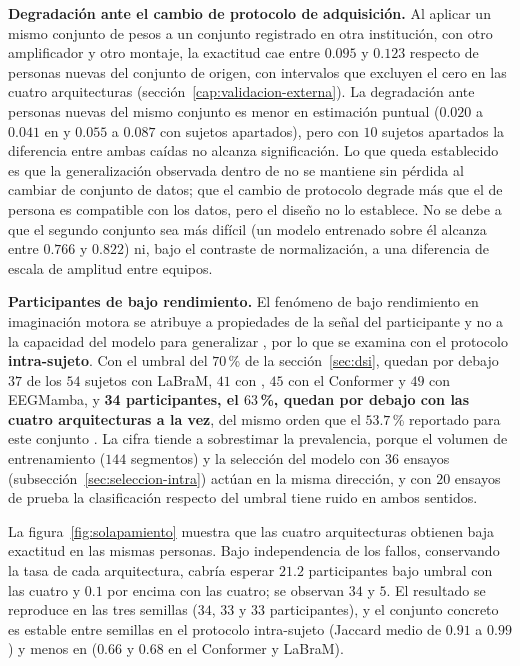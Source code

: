 \textbf{Degradación ante el cambio de protocolo de adquisición.} Al aplicar un mismo conjunto de pesos a un
conjunto registrado en otra institución, con otro amplificador y otro montaje, la exactitud cae entre $0.095$
y $0.123$ respecto de personas nuevas del conjunto de origen, con intervalos que excluyen el cero en las
cuatro arquitecturas (sección~\ref{cap:validacion-externa}). La degradación ante personas nuevas del mismo
conjunto es menor en estimación puntual ($0.020$ a $0.041$ en \loso{} y $0.055$ a $0.087$ con sujetos
apartados), pero con $10$ sujetos apartados la diferencia entre ambas caídas no alcanza significación. Lo que
queda establecido es que la generalización observada dentro de \openbmi{} no se mantiene sin pérdida al
cambiar de conjunto de datos; que el cambio de protocolo degrade más que el de persona es compatible con los
datos, pero el diseño no lo establece. No se debe a que el segundo conjunto sea más difícil (un modelo
entrenado sobre él alcanza entre $0.766$ y $0.822$) ni, bajo el contraste de normalización, a una diferencia
de escala de amplitud entre equipos.

\textbf{Participantes de bajo rendimiento.} El fenómeno de bajo rendimiento en imaginación motora se atribuye
a propiedades de la señal del participante y no a la capacidad del modelo para generalizar
\cite{vidaurre2010,blankertz2010}, por lo que se examina con el protocolo \textbf{intra-sujeto}. Con el umbral
del $70$\,\% de la sección~\ref{sec:dsi}, quedan por debajo $37$ de los $54$ sujetos con LaBraM, $41$ con
\eegnet{}, $45$ con el Conformer y $49$ con EEGMamba, y \textbf{34 participantes, el $63$\,\%, quedan por
debajo con las cuatro arquitecturas a la vez}, del mismo orden que el $53.7$\,\% reportado para este conjunto
\cite{lee2019}. La cifra tiende a sobrestimar la prevalencia, porque el volumen de entrenamiento ($144$
segmentos) y la selección del modelo con $36$ ensayos (subsección~\ref{sec:seleccion-intra}) actúan en la misma
dirección, y con $20$ ensayos de prueba la clasificación respecto del umbral tiene ruido en ambos sentidos.

La figura~\ref{fig:solapamiento} muestra que las cuatro arquitecturas obtienen baja exactitud en las mismas
personas. Bajo independencia de los fallos, conservando la tasa de cada arquitectura, cabría esperar $21.2$
participantes bajo umbral con las cuatro y $0.1$ por encima con las cuatro; se observan $34$ y $5$. El
resultado se reproduce en las tres semillas ($34$, $33$ y $33$ participantes), y el conjunto concreto es estable
entre semillas en el protocolo intra-sujeto (Jaccard medio de $0.91$ a $0.99$) y menos en \loso{} ($0.66$ y
$0.68$ en el Conformer y LaBraM).

